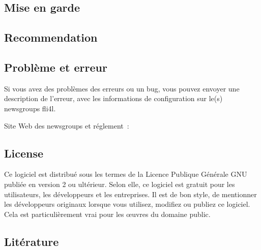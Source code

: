 \subsection{Mise en garde}


\subsection{Recommendation}


\subsection{Problème et erreur}

Si vous avez des problèmes des erreurs ou un bug, vous pouvez envoyer
une description de l'erreur, avec les informations de configuration
sur le(s) newsgroups fli4l.

Site Web des newsgroups et réglement~:\\

\subsection{License}

Ce logiciel est distribué sous les termes de la Licence Publique Générale GNU
publiée en version 2 ou ultérieur. Selon elle, ce logiciel est gratuit pour
les utilisateurs, les développeurs et les entreprises. Il est de bon style,
de mentionner les développeurs originaux lorsque vous utilisez, modifiez ou
publiez ce logiciel. Cela est particulièrement vrai pour les \oe{}uvres
du domaine public.

\subsection{Litérature}

